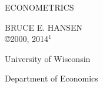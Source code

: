 \begin{center}
ECONOMETRICS

BRUCE E. HANSEN\\
\copyright 2000, 2014$^{1}$

University of Wisconsin

Department of Economics
\end{center}